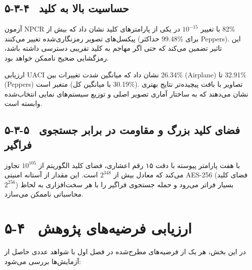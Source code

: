 \subsection{۵-۳-۴  حساسیت بالا به کلید}

آزمون ‎NPCR‎ با تغییر $10^{-15}$ در یکی از پارامترهای کلید نشان داد که بیش از ‎‎82\%‎‎ پیکسل‌های تصویر رمزنگاری‌شده تغییر می‌کنند (حداکثر ‎‎99.48\%‎‎ برای ‎Peppers‎). این تاثیر  تضمین می‌کند که حتی اگر مهاجم به کلید تقریبی دسترسی داشته باشد، رمزگشایی صحیح ناممکن خواهد بود.

ارزیابی ‎UACI‎ نشان داد که میانگین شدت تغییرات بین ‎‎26.34\%‎‎ (‎Airplane‎) تا ‎‎32.91\%‎‎ (‎Peppers‎) متغیر است (با میانگین کل ‎‎30.19\%‎‎). تصاویر با بافت پیچیده‌تر نتایج بهتری نشان می‌دهند که به ساختار آماری تصویر اصلی و توزیع سیستم‌های نمایی انتخاب‌شده وابسته است.

\subsection{۵-۳-۵  فضای کلید بزرگ و مقاومت در برابر جستجوی فراگیر}

با هفت پارامتر پیوسته با دقت ۱۵ رقم اعشاری، فضای کلید الگوریتم از $10^{105}$ تجاوز می‌کند که معادل بیش از $2^{348}$ است.  این مقدار از آستانه امنیتی ‎AES-256‎ (فضای کلید $2^{256}$) بسیار فراتر می‌رود و حمله جستجوی فراگیر را با هر سخت‌افزاری به لحاظ محاسباتی ناممکن می‌سازد.

\section{۵-۴  ارزیابی فرضیه‌های پژوهش}

در این بخش، هر یک از فرضیه‌های مطرح‌شده در فصل اول با شواهد عددی حاصل از آزمایش‌ها بررسی می‌شود:

\begin{table}[h]
\centering
\footnotesize
{}
\caption{ارزیابی فرضیه‌های پژوهش بر اساس نتایج تجربی}
\end{table}

